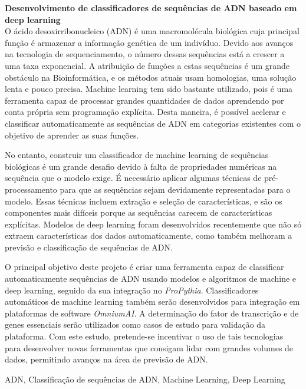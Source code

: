 {\large \textbf{Desenvolvimento de classificadores de sequências de ADN baseado em deep learning}}\\[1ex]
\noindent O ácido desoxirribonucleico (ADN) é uma macromolécula biológica cuja principal função é armazenar a informação genética de um indivíduo. Devido aos avanços na tecnologia de sequenciamento, o número dessas sequências está a crescer a uma taxa exponencial. A atribuição de funções a estas sequências é um grande obstáculo na Bioinformática, e os métodos atuais usam homologias, uma solução lenta e pouco precisa. Machine learning tem sido bastante utilizado, pois é uma ferramenta capaz de processar grandes quantidades de dados aprendendo por conta própria sem programação explícita. Desta maneira, é possível acelerar e classificar automaticamente as sequências de ADN em categorias existentes com o objetivo de aprender as suas funções.

No entanto, construir um classificador de machine learning de sequências biológicas é um grande desafio devido à falta de propriedades numéricas na sequência que o modelo exige. É necessário aplicar algumas técnicas de pré-processamento para que as sequências sejam devidamente representadas para o modelo. Essas técnicas incluem extração e seleção de características, e são os componentes mais difíceis porque as sequências carecem de características explícitas. Modelos de deep learning foram desenvolvidos recentemente que não só extraem características dos dados automaticamente, como também melhoram a previsão e classificação de sequências de ADN.

O principal objetivo deste projeto é criar uma ferramenta capaz de classificar automaticamente sequências de ADN usando modelos e algoritmos de machine e deep learning, seguido da sua integração no \textit{ProPythia}. Classificadores automáticos de machine learning também serão desenvolvidos para integração em plataformas de software \textit{OmniumAI}. A determinação do fator de transcrição e de genes essenciais serão utilizados como casos de estudo para validação da plataforma. Com este estudo, pretende-se incentivar o uso de tais tecnologias para desenvolver novas ferramentas que consigam lidar com grandes volumes de dados, permitindo avanços na área de previsão de ADN.

\begin{keywords}
ADN, Classificação de sequências de ADN, Machine Learning, Deep Learning
\end{keywords}
